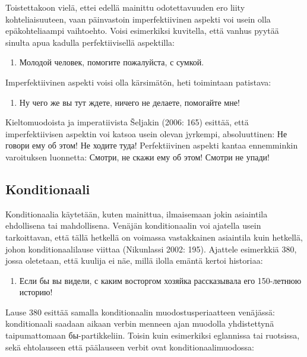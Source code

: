\documentclass[]{scrartcl}
\providecommand{\tightlist}{%
  \setlength{\itemsep}{0pt}\setlength{\parskip}{0pt}}
\begin{document}
Toistettakoon vielä, ettei edellä mainittu odotettavuuden ero liity
kohteliaisuuteen, vaan päinvastoin imperfektiivinen aspekti voi usein
olla epäkohteliaampi vaihtoehto. Voisi esimerkiksi kuvitella, että
vanhus pyytää sinulta apua kadulla perfektiivisellä aspektilla:

\begin{enumerate}
\def\labelenumi{(\arabic{enumi})}
\setcounter{enumi}{377}
\tightlist
\item
  Молодой человек, помогите пожалуйста, с сумкой.
\end{enumerate}

Imperfektiivinen aspekti voisi olla kärsimätön, heti toimintaan
patistava:

\begin{enumerate}
\def\labelenumi{(\arabic{enumi})}
\setcounter{enumi}{378}
\tightlist
\item
  Ну чего же вы тут ждете, ничего не делаете, помогайте мне!
\end{enumerate}

Kieltomuodoista ja imperatiivista Šeljakin (2006: 165) esittää, että
imperfektiivisen aspektin voi katsoa usein olevan jyrkempi,
absoluuttinen: Не говори ему об этом! Не ходите туда! Perfektiivinen
aspekti kantaa ennemminkin varoituksen luonnetta: Смотри, не скажи ему
об этом! Смотри не упади!

\subsection{Konditionaali}\label{konditionaali}

Konditionaalia käytetään, kuten mainittua, ilmaisemaan jokin asiaintila
ehdollisena tai mahdollisena. Venäjän konditionaalin voi ajatella usein
tarkoittavan, että tällä hetkellä on voimassa vastakkainen asiaintila
kuin hetkellä, johon konditionaalilause viittaa (Nikunlassi 2002: 195).
Ajattele esimerkkiä 380, jossa oletetaan, että kuulija ei näe, millä
ilolla emäntä kertoi historiaa:

\begin{enumerate}
\def\labelenumi{(\arabic{enumi})}
\setcounter{enumi}{379}
\tightlist
\item
  Если бы вы видели, с каким восторгом хозяйка рассказывала его
  150-летнюю историю!
\end{enumerate}

Lause 380 esittää samalla konditionaalin muodostusperiaatteen venäjässä:
konditionaali saadaan aikaan verbin menneen ajan muodolla yhdistettynä
taipumattomaan бы-partikkeliin. Toisin kuin esimerkiksi eglannissa tai
ruotsissa, sekä ehtolauseen että päälauseen verbit ovat
konditionaalimuodossa:
\end{document}
